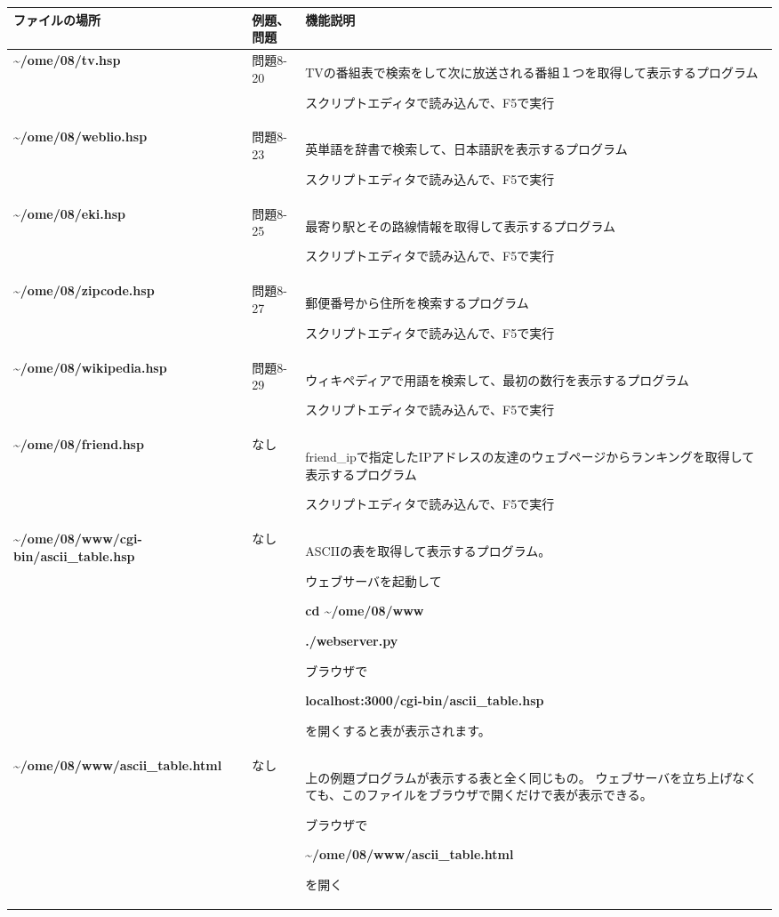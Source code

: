 \documentclass[a4paper,12pt,dvipdfmx]{jarticle}
\begin{document}
\begin{flushleft}
\tablefirsthead{}
\tablehead{}
\tabletail{}
\tablelasttail{}
\begin{supertabular}{|m{6.7730002cm}|m{2.042cm}|m{7.5810003cm}|}
\hline
ファイルの場所 &
例題、問題 &
機能説明\\\hline
	\textbf{\~{}/ome/08/tv.hsp} &
問題8-20 &
TVの番組表で検索をして次に放送される番組１つを取得して表示するプログラム

スクリプトエディタで読み込んで、F5で実行\\\hline
	\textbf{\~{}/ome/08/weblio.hsp} &
問題8-23 &
英単語を辞書で検索して、日本語訳を表示するプログラム

スクリプトエディタで読み込んで、F5で実行\\\hline
	\textbf{\~{}/ome/08/eki.hsp} &
問題8-25 &
最寄り駅とその路線情報を取得して表示するプログラム

スクリプトエディタで読み込んで、F5で実行\\\hline
	\textbf{\~{}/ome/08/zipcode.hsp} &
問題8-27 &
郵便番号から住所を検索するプログラム

スクリプトエディタで読み込んで、F5で実行\\\hline
	\textbf{\~{}/ome/08/wikipedia.hsp} &
問題8-29 &
ウィキペディアで用語を検索して、最初の数行を表示するプログラム

スクリプトエディタで読み込んで、F5で実行\\\hline
	\textbf{\~{}/ome/08/friend.hsp} &
なし &
friend\_ipで指定したIPアドレスの友達のウェブページからランキングを取得して表示するプログラム

スクリプトエディタで読み込んで、F5で実行\\\hline
	\textbf{\~{}/ome/08/www/cgi-bin/ascii\_table.hsp} &
なし &
ASCIIの表を取得して表示するプログラム。

ウェブサーバを起動して

	\textbf{cd \~{}/ome/08/www}

	\textbf{./webserver.py}

ブラウザで

	\textbf{localhost:3000/cgi-bin/ascii\_table.hsp}

を開くすると表が表示されます。\\\hline
	\textbf{\~{}/ome/08/www/ascii\_table.html} &
なし &
上の例題プログラムが表示する表と全く同じもの。
	ウェブサーバを立ち上げなくても、このファイルをブラウザで開くだけで表が表示できる。

ブラウザで

	\textbf{\~{}/ome/08/www/ascii\_table.html}

を開く\\\hline
\end{supertabular}
\end{flushleft}
\end{document}
